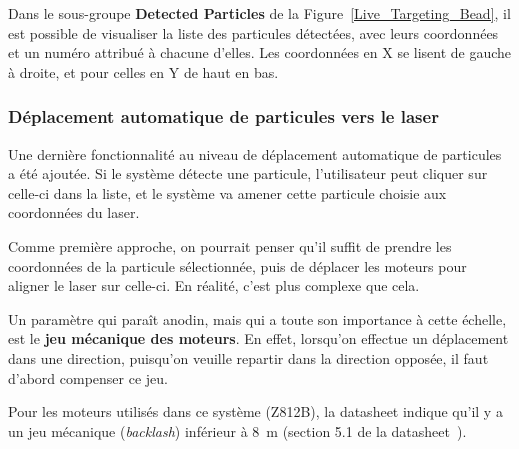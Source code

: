 Dans le sous-groupe \textbf{Detected Particles} de la Figure~\ref{Live_Targeting_Bead}, il est possible de visualiser la liste des particules détectées, avec leurs coordonnées et un numéro attribué à chacune d'elles. Les coordonnées en X se lisent de gauche à droite, et pour celles en Y de haut en bas.

\newpage
\subsubsection{Déplacement automatique de particules vers le laser}
Une dernière fonctionnalité au niveau de déplacement automatique de particules a été ajoutée. Si le système détecte une particule, l'utilisateur peut cliquer sur celle-ci dans la liste, et le système va amener cette particule choisie aux coordonnées du laser.

Comme première approche, on pourrait penser qu'il suffit de prendre les coordonnées de la particule sélectionnée, puis de déplacer les moteurs pour aligner le laser sur celle-ci. En réalité, c'est plus complexe que cela.

Un paramètre qui paraît anodin, mais qui a toute son importance à cette échelle, est le \textbf{jeu mécanique des moteurs}. En effet, lorsqu'on effectue un déplacement dans une direction, puisqu'on veuille repartir dans la direction opposée, il faut d'abord compenser ce jeu.

Pour les moteurs utilisés dans ce système (Z812B), la datasheet indique qu'il y a un jeu mécanique (\textit{backlash}) inférieur à 8~\textmu m (section 5.1 de la datasheet~\cite{motorZ812B}).

